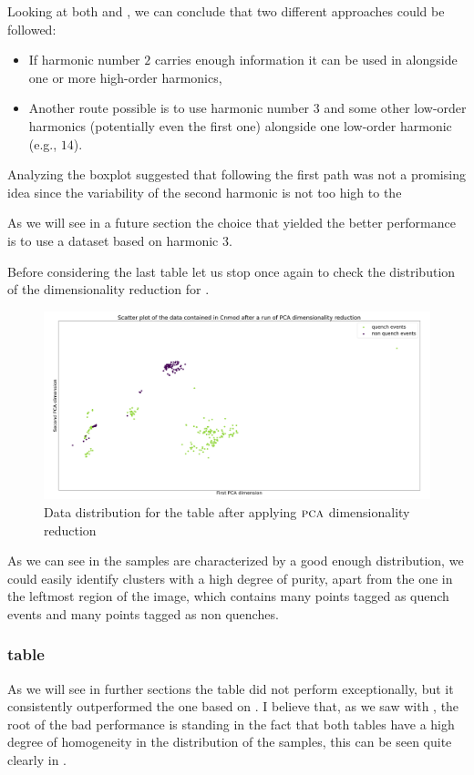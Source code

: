Looking at both  and , we can conclude that two different
approaches could be followed:
\begin{itemize}
	\item If harmonic number $2$ carries enough information it can be used in alongside one or
	      more high-order harmonics,
	\item Another route possible is to use harmonic number $3$ and some other low-order
	      harmonics (potentially even the first one) alongside one low-order harmonic (e.g.,
	      $14$).
\end{itemize}
Analyzing the boxplot suggested that following the first path was not a promising idea since the
variability of the second harmonic is not too high to the

As we will see in a future section the choice that yielded the better performance is to use a
dataset based on harmonic $3$.

Before considering the last table let us stop once again to check the distribution of the
dimensionality reduction for \cnmod.
\begin{figure}[h!]
	\centering
	\includegraphics[width=\linewidth]{img/Cnmod_distribution.png}
	\caption{Data distribution for the \cnmod table after applying $\textsc{pca}$ dimensionality
		reduction} \label{fig:cnmod-dist}
\end{figure}
As we can see in  the samples are characterized by a good enough distribution,
we could easily identify clusters with a high degree of purity, apart from the one in the leftmost
region of the image, which contains many points tagged as quench events and many points tagged as
non quenches.

\subsubsection{\phin table}
As we will see in further sections the \phin table did not perform exceptionally, but it consistently
outperformed the one based on \bn. I believe that, as we saw with \bn, the root of the bad performance
is standing in the fact that both tables have a high degree of homogeneity in the distribution of
the samples, this can be seen quite clearly in .

